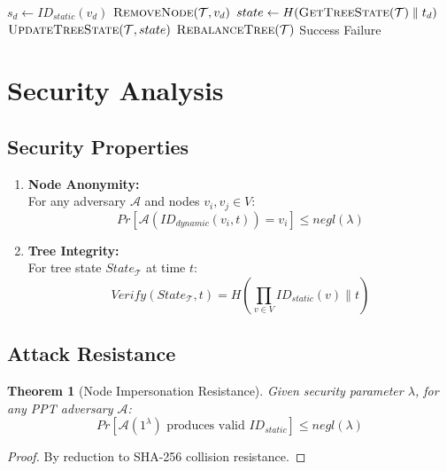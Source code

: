 \documentclass[12pt]{article}
\newtheorem{theorem}{Theorem}
\theoremstyle{definition}
\theoremstyle{remark}
\begin{document}
\begin{algorithm}
\caption{Node Departure}
\begin{algorithmic}[1]
    \State $s_d \gets ID_{static}(v_d)$
        \State $\textsc{RemoveNode}(\mathcal{T}, v_d)$
        \State $state \gets H(\textsc{GetTreeState}(\mathcal{T}) \parallel t_d)$
        \State $\textsc{UpdateTreeState}(\mathcal{T}, state)$
        \State $\textsc{RebalanceTree}(\mathcal{T})$
        \State \Return Success
    \EndIf
    \State \Return Failure
\EndProcedure
\end{algorithmic}
\end{algorithm}

\section{Security Analysis}

\subsection{Security Properties}

\begin{enumerate}
\item \textbf{Node Anonymity:}\\
For any adversary $\mathcal{A}$ and nodes $v_i, v_j \in V$:
\[Pr[\mathcal{A}(ID_{dynamic}(v_i, t)) = v_i] \leq negl(\lambda)\]

\item \textbf{Tree Integrity:}\\
For tree state $State_{\mathcal{T}}$ at time $t$:
\[Verify(State_{\mathcal{T}}, t) = H(\prod_{v \in V} ID_{static}(v) \parallel t)\]
\end{enumerate}

\subsection{Attack Resistance}

\begin{theorem}[Node Impersonation Resistance]
Given security parameter $\lambda$, for any PPT adversary $\mathcal{A}$:
\[Pr[\mathcal{A}(1^\lambda) \text{ produces valid } ID_{static}] \leq negl(\lambda)\]
\end{theorem}

\begin{proof}
By reduction to SHA-256 collision resistance.
\end{proof}
\end{document}
